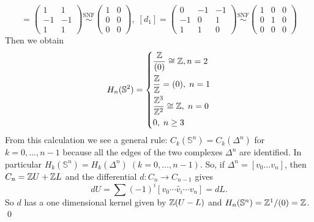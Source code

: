 \begin{equation}
    [d_2]=\begin{pmatrix}
        1&1\\-1&-1\\1&1
    \end{pmatrix}
    \overset{\text{SNF}}{\sim}
    \begin{pmatrix}
        1&0\\0&0\\0&0
    \end{pmatrix},\;
    [d_1]=\begin{pmatrix}
        0&-1&-1\\-1&0&1\\1&1&0
    \end{pmatrix}\overset{\text{SNF}}{\sim}
    \begin{pmatrix}
        1&0&0\\0&1&0\\0&0&0
    \end{pmatrix}
\end{equation}
Then we obtain  
\begin{equation}
    H_n(\mathbb{S}^2)=\left\{\begin{aligned}
        &\frac{\mathbb{Z}}{(0)}\cong \mathbb{Z}, n=2\\
        &\frac{\mathbb{Z}}{\mathbb{Z}}=(0),\;n=1\\
        &\frac{\mathbb{Z}^3}{\mathbb{Z}^2}\cong\mathbb{Z},\;n=0\\
        &0,\; n\geq3
    \end{aligned}\right. 
\end{equation}
From this calculation we see a general rule: 
$C_k(\mathbb{S}^n)=C_k(\Delta^n)$ for $k=0,\dots,n-1$ because all the edges of the two complexes $\Delta^n$
are identified. In particular $H_k(\mathbb{S}^n)=H_k(\Delta^n)\;(k=0,\dots,n-1)$.  
So, if $\Delta^n=[v_0\dots v_n]$, then $C_n = \mathbb{Z} U+\mathbb{Z} L$ and the differential 
$d:C_n\to C_{n-1}$ gives 
\begin{equation}
    dU = \sum (-1)^i[v_0\cdots \hat{v}_i\cdots v_n] = dL.
\end{equation} 
So $d$ has a one dimensional kernel given by $\mathbb{Z}(U-L)$ and $H_n(\mathbb{S}^n)=\mathbb{Z}^{1}/(0)=\mathbb{Z}$. \qed

